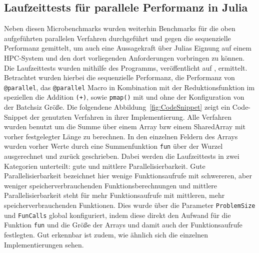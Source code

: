 \documentclass[proseminar,german,utf8]{zihpub}
\begin{document}
\subsection{Laufzeittests für parallele Performanz in Julia}

Neben diesen Microbenchmarks wurden weiterhin Benchmarks für die oben aufgeführten parallelen Verfahren durchgeführt und gegen die sequenzielle Performanz gemittelt, um auch eine Aussagekraft über Julias Eignung auf einem HPC-System und den dort vorliegenden Anforderungen vorbringen zu können. Die Laufzeittests wurden mithilfe des Programms, veröffentlicht auf \cite{JuliaCookbook}, ermittelt. Betrachtet wurden hierbei die sequenzielle Performanz, die Performanz von \verb|@parallel|, das \verb|@parallel| Macro in Kombination mit der Reduktionsfunktion im speziellen die Addition \verb|(+)|, sowie \verb|pmap()| mit und ohne der Konfiguration von der Batchsiz  Größe. Die folgendene Abbildung~\ref{fig:CodeSnippet} zeigt ein Code-Snippet der genutzten Verfahren in ihrer Implementierung. Alle Verfahren wurden benutzt um die Summe über einem Array bzw einem SharedArray mit vorher festgelegter Länge zu berechnen. In den einzelnen Feldern des Arrays wurden vorher Werte durch eine Summenfunktion \verb|fun| über der Wurzel ausgerechnet und zurück geschrieben. Dabei werden die Laufzeittests in zwei Kategorien unterteilt: gute und mittlere Parallelisierbarkeit. Gute Parallelisierbarkeit bezeichnet hier wenige Funktionsaufrufe mit schwereren, aber weniger speicherverbrauchenden Funktionsberechnungen und mittlere Parallelisierbarkeit steht für mehr Funktionsaufrufe mit mittleren, mehr speicherverbrauchenden Funktionen. Dies wurde über die Parameter \verb|ProblemSize| und \verb|FunCalls| global konfiguriert, indem diese direkt den Aufwand für die Funktion \verb|fun| und die Größe der Arrays und damit auch der Funktionsaufrufe festlegten. Gut erkennbar ist zudem, wie ähnlich sich die einzelnen Implementierungen sehen. 
\end{document}
